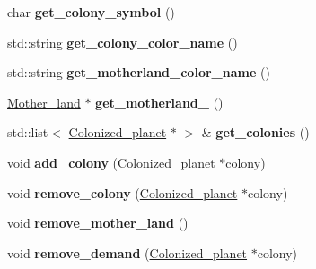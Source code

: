\begin{DoxyCompactItemize}
\item 
\hypertarget{classFaction_a72aec7ed1856741ef6ec6cec3049c057}{char {\bfseries get\-\_\-colony\-\_\-symbol} ()}\label{classFaction_a72aec7ed1856741ef6ec6cec3049c057}

\item 
\hypertarget{classFaction_a2e31e6fb93e25c7bac4a7e3d28ac4169}{std\-::string {\bfseries get\-\_\-colony\-\_\-color\-\_\-name} ()}\label{classFaction_a2e31e6fb93e25c7bac4a7e3d28ac4169}

\item 
\hypertarget{classFaction_a4258c106abb09cb851a21980b8fc4996}{std\-::string {\bfseries get\-\_\-motherland\-\_\-color\-\_\-name} ()}\label{classFaction_a4258c106abb09cb851a21980b8fc4996}

\item 
\hypertarget{classFaction_a4e27a1269e4e34e6abfed1302a9cf7e3}{\hyperlink{classMother__land}{Mother\-\_\-land} $\ast$ {\bfseries get\-\_\-motherland\-\_\-} ()}\label{classFaction_a4e27a1269e4e34e6abfed1302a9cf7e3}

\item 
\hypertarget{classFaction_a54e816116f2274310608bd6dfcf65dad}{std\-::list$<$ \hyperlink{classColonized__planet}{Colonized\-\_\-planet} $\ast$ $>$ \& {\bfseries get\-\_\-colonies} ()}\label{classFaction_a54e816116f2274310608bd6dfcf65dad}

\item 
\hypertarget{classFaction_ab5d7a35b69eab9770069c27f2b61d527}{void {\bfseries add\-\_\-colony} (\hyperlink{classColonized__planet}{Colonized\-\_\-planet} $\ast$colony)}\label{classFaction_ab5d7a35b69eab9770069c27f2b61d527}

\item 
\hypertarget{classFaction_a0806d816ec82da48403a87a515e9ad0a}{void {\bfseries remove\-\_\-colony} (\hyperlink{classColonized__planet}{Colonized\-\_\-planet} $\ast$colony)}\label{classFaction_a0806d816ec82da48403a87a515e9ad0a}

\item 
\hypertarget{classFaction_a5c704bccee1f3c845b3b521429bc4e60}{void {\bfseries remove\-\_\-mother\-\_\-land} ()}\label{classFaction_a5c704bccee1f3c845b3b521429bc4e60}

\item 
\hypertarget{classFaction_ae90c4eab208071323dbc6c0991a22051}{void {\bfseries remove\-\_\-demand} (\hyperlink{classColonized__planet}{Colonized\-\_\-planet} $\ast$colony)}\label{classFaction_ae90c4eab208071323dbc6c0991a22051}


\end{DoxyCompactItemize}
